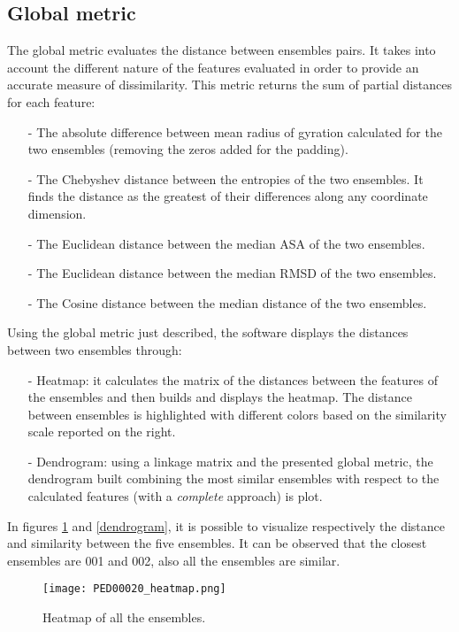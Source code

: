 \subsection{Global metric}
The global metric evaluates the distance between ensembles pairs. It takes into account the different nature of the features evaluated in order to provide an accurate measure of dissimilarity.
This metric returns the sum of partial distances for each feature:
\begin{itemize}
\item[-] The absolute difference between mean radius of gyration calculated for the two ensembles (removing the zeros added for the padding).
\item[-] The Chebyshev distance between the entropies of the two ensembles. It finds the distance as the greatest of their differences along any coordinate dimension.
\item[-] The Euclidean distance between the median ASA of the two ensembles.
\item[-] The Euclidean distance between the median RMSD of the two ensembles.
\item[-] The Cosine distance between the median distance of the two ensembles.
\end{itemize}


Using the global metric just described, the software displays the distances between two ensembles through:
\begin{itemize}
\item[-] Heatmap: it calculates the matrix of the distances between the features of the ensembles and then builds and displays the heatmap. The distance between ensembles is highlighted with different colors based on the similarity scale reported on the right. 
\item[-] Dendrogram: using a linkage matrix and the presented global metric, the dendrogram built combining the most similar ensembles with respect to the calculated features (with a \emph{complete} approach) is plot.
\end{itemize}

In figures \ref{heatmap} and \ref{dendrogram}, it is possible to visualize respectively the distance and similarity between the five ensembles. It can be observed that the closest ensembles are 001 and 002, also all the ensembles are similar.

\begin{figure}[H]
    \centering
		\texttt{[image: PED00020\_heatmap.png]}
		\caption{Heatmap of all the ensembles.}
		\label{heatmap}
\end{figure}

